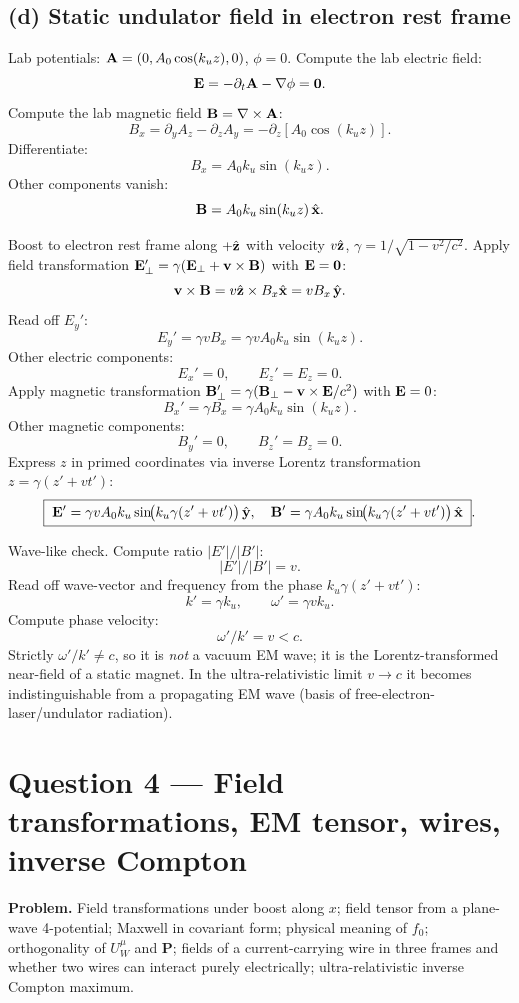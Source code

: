 \documentclass[11pt]{article}
\begin{document}
\subsection*{(d) Static undulator field in electron rest frame}

Lab potentials: $\vb A=(0,A_0\cos(k_u z),0)$, $\phi=0$. Compute the lab electric field:
\[
\vb E = -\partial_t \vb A - \nabla\phi = \vb 0.
\]
Compute the lab magnetic field $\vb B = \nabla\times\vb A$:
\[
B_x = \partial_y A_z - \partial_z A_y = -\partial_z[A_0\cos(k_u z)].
\]
Differentiate:
\[
B_x = A_0 k_u\sin(k_u z).
\]
Other components vanish:
\[
\vb B = A_0 k_u\sin(k_u z)\,\hat{\vb x}.
\]

Boost to electron rest frame along $+\hat{\vb z}$ with velocity $v\hat{\vb z}$, $\gamma=1/\sqrt{1-v^2/c^2}$. Apply field transformation $\vb E_\perp' = \gamma(\vb E_\perp + \vb v\times\vb B)$ with $\vb E=\vb 0$:
\[
\vb v\times\vb B = v\hat{\vb z}\times B_x\hat{\vb x} = v B_x\,\hat{\vb y}.
\]
Read off $E_y'$:
\[
E_y' = \gamma v B_x = \gamma v A_0 k_u \sin(k_u z).
\]
Other electric components:
\[
E_x' = 0,\qquad E_z' = E_z = 0.
\]
Apply magnetic transformation $\vb B_\perp' = \gamma(\vb B_\perp - \vb v\times\vb E/c^2)$ with $\vb E=0$:
\[
B_x' = \gamma B_x = \gamma A_0 k_u\sin(k_u z).
\]
Other magnetic components:
\[
B_y' = 0,\qquad B_z' = B_z = 0.
\]
Express $z$ in primed coordinates via inverse Lorentz transformation $z = \gamma(z' + v t')$:
\[
\boxed{\;\vb E' = \gamma v A_0 k_u \sin\!\bigl(k_u\gamma(z'+vt')\bigr)\,\hat{\vb y},\quad \vb B' = \gamma A_0 k_u \sin\!\bigl(k_u\gamma(z'+vt')\bigr)\,\hat{\vb x}\;}.
\]

Wave-like check. Compute ratio $|E'|/|B'|$:
\[
|E'|/|B'| = v.
\]
Read off wave-vector and frequency from the phase $k_u\gamma(z'+vt')$:
\[
k' = \gamma k_u,\qquad \omega' = \gamma v k_u.
\]
Compute phase velocity:
\[
\omega'/k' = v < c.
\]
Strictly $\omega'/k' \neq c$, so it is \emph{not} a vacuum EM wave; it is the Lorentz-transformed near-field of a static magnet. In the ultra-relativistic limit $v\to c$ it becomes indistinguishable from a propagating EM wave (basis of free-electron-laser/undulator radiation).

\section*{Question 4 --- Field transformations, EM tensor, wires, inverse Compton}

\textbf{Problem.} Field transformations under boost along $x$; field tensor from a plane-wave 4-potential; Maxwell in covariant form; physical meaning of $f_0$; orthogonality of $U_W^\mu$ and $\bm P$; fields of a current-carrying wire in three frames and whether two wires can interact purely electrically; ultra-relativistic inverse Compton maximum.
\end{document}

